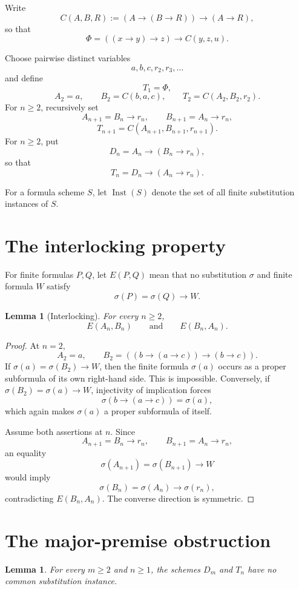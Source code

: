 \documentclass[11pt]{article}
\newtheorem{lemma}[theorem]{Lemma}
\newcommand{\Imp}{\mathbin{\to}}
\newcommand{\Inst}{\operatorname{Inst}}
\begin{document}
Write
\[
C(A,B,R):=(A\Imp(B\Imp R))\Imp(A\Imp R),
\]
so that
\[
\Phi=((x\Imp y)\Imp z)\Imp C(y,z,u).
\]

Choose pairwise distinct variables
\[
a,b,c,r_2,r_3,\ldots
\]
and define
\[
T_1=\Phi,
\]
\[
A_2=a,\qquad B_2=C(b,a,c),\qquad T_2=C(A_2,B_2,r_2).
\]
For $n\ge2$, recursively set
\[
A_{n+1}=B_n\Imp r_n,\qquad
B_{n+1}=A_n\Imp r_n,
\]
\[
T_{n+1}=C(A_{n+1},B_{n+1},r_{n+1}).
\]
For $n\ge2$, put
\[
D_n=A_n\Imp(B_n\Imp r_n),
\]
so that
\[
T_n=D_n\Imp(A_n\Imp r_n).
\]

For a formula scheme $S$, let $\Inst(S)$ denote the set of all finite
substitution instances of $S$.

\section{The interlocking property}

For finite formulas $P,Q$, let $E(P,Q)$ mean that no substitution $\sigma$
and finite formula $W$ satisfy
\[
\sigma(P)=\sigma(Q)\Imp W.
\]

\begin{lemma}[Interlocking]\label{lem:interlocking}
For every $n\ge2$,
\[
E(A_n,B_n)\qquad\text{and}\qquad E(B_n,A_n).
\]
\end{lemma}

\begin{proof}
At $n=2$,
\[
A_2=a,\qquad
B_2=((b\Imp(a\Imp c))\Imp(b\Imp c)).
\]
If $\sigma(a)=\sigma(B_2)\Imp W$, then the finite formula
$\sigma(a)$ occurs as a proper subformula of its own right-hand side.
This is impossible.  Conversely, if $\sigma(B_2)=\sigma(a)\Imp W$, injectivity
of implication forces
\[
\sigma(b\Imp(a\Imp c))=\sigma(a),
\]
which again makes $\sigma(a)$ a proper subformula of itself.

Assume both assertions at $n$.  Since
\[
A_{n+1}=B_n\Imp r_n,\qquad
B_{n+1}=A_n\Imp r_n,
\]
an equality
\[
\sigma(A_{n+1})=\sigma(B_{n+1})\Imp W
\]
would imply
\[
\sigma(B_n)=\sigma(A_n)\Imp\sigma(r_n),
\]
contradicting $E(B_n,A_n)$.  The converse direction is symmetric.
\end{proof}

\section{The major-premise obstruction}

\begin{lemma}\label{lem:major}
For every $m\ge2$ and $n\ge1$, the schemes $D_m$ and $T_n$
have no common substitution instance.
\end{lemma}
\end{document}

